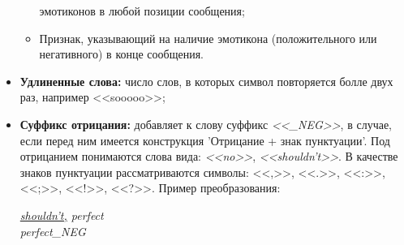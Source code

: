 \begin{itemize}
\begin{itemize}
                    эмотиконов в любой позиции сообщения;
                \item Признак, указывающий на наличие эмотикона (положительного
                    или негативного) в конце сообщения.
            \end{itemize}
        \item {\bf Удлиненные слова:} число слов, в которых символ повторяется болле
            двух раз, например <<sooooo>>;
        \item {\bf Суффикс отрицания:} добавляет к слову суффикс {\it <<\_NEG>>},
            в случае, если перед ним имеется конструкция 'Отрицание +
            знак пунктуации'.
            Под отрицанием понимаются слова вида: {\it<<no>>}, {\it <<shouldn't>>}.
            В качестве знаков пунктуации рассматриваются символы:
            <<,>>, <<.>>, <<:>>, <<;>>, <<!>>, <<?>>.
            Пример преобразования:
            \begin{center}
                \it
                \underline{shouldn't,} perfect \\
                perfect\_NEG
            \end{center}
    \end{itemize}



